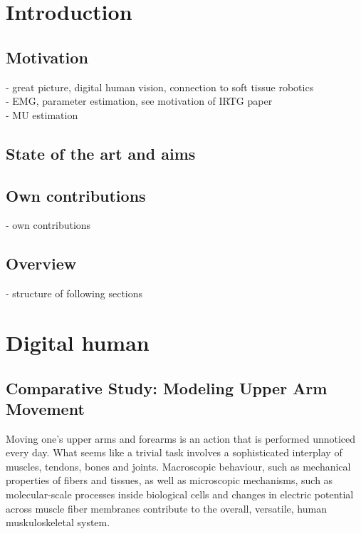 

\graphicspath{
{images/summer_school_study/png/}{images/summer_school_study/}{images/summer_school_study/plots/}{images/summer_school_study/2018/}
}



\tableofcontents


\part{Introduction}
  \chapter{Motivation}
  - great picture, digital human vision, connection to soft tissue robotics\\
  - EMG, parameter estimation, see motivation of IRTG paper\\
  - MU estimation\\
  
  \chapter{State of the art and aims}
  \chapter{Own contributions}
  - own contributions
  \chapter{Overview}
  - structure of following sections
\part{Digital human}

\chapter{Comparative Study: Modeling Upper Arm Movement}

Moving one's upper arms and forearms is an action that is performed unnoticed every day. 
What seems like a trivial task involves a sophisticated interplay of muscles, tendons, bones and joints. Macroscopic behaviour, such as mechanical properties of fibers and tissues, as well as microscopic mechanisms, such as molecular-scale processes inside biological cells and changes in electric potential across muscle fiber membranes contribute to the overall, versatile, human muskuloskeletal system.

